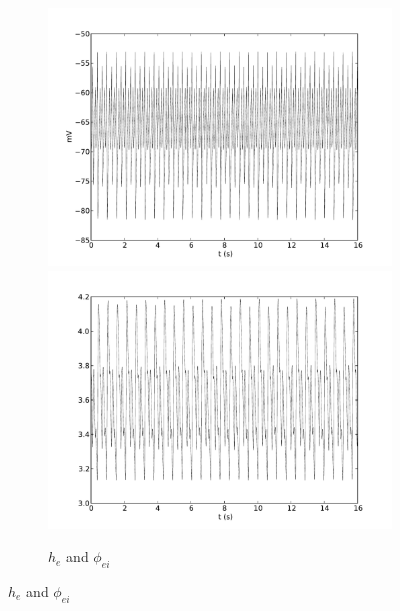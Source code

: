 \documentclass[a4paper,12pt]{article}
\begin{document}
\begin{figure}
	\begin{subfigure}[b]{1\textwidth}
		\includegraphics[scale=0.32]{frontiers-2012-images-revised/biphasic-gamma_yml-00214_ode-phi-burst-split-v-1-0_05-5-0_5_yml-he-phi.pdf}
		\includegraphics[scale=0.32]{frontiers-2012-images-revised/biphasic-gamma_yml-00214_ode-phi-burst-split-v-1-0_05-5-0_5_yml-phi_ei-phi.pdf}
		\caption{$h_e$ and $\phi_{ei}$}
	\end{subfigure}


\end{figure}
\end{document}
